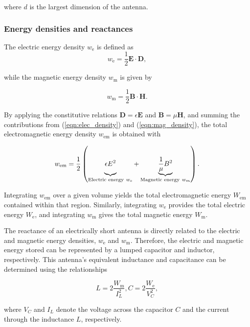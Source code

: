 where $d$ is the largest dimension of the antenna.

\FloatBarrier
\subsubsection{Energy densities and reactances}\label{sec:energy-densities-reactances}

The electric energy density $w_{\mathrm{e}}$ is defined as 
\begin{equation}
	w_{\mathrm{e}} = \frac{1}{2} \mathbf{E} \cdot \mathbf{D},
	\label{eqn:elec_density}
\end{equation}

while the magnetic energy density $w_{\mathrm{m}}$ is given by 

\begin{equation}
	w_{\mathrm{m}} = \frac{1}{2} \mathbf{B} \cdot \mathbf{H}.
	\label{eqn:mag_density}
\end{equation}

By applying the constitutive relations $\mathbf{D} = \epsilon \mathbf{E}$ and $\mathbf{B} = \mu \mathbf{H}$, and summing the contributions from (\ref{eqn:elec_density}) and (\ref{eqn:mag_density}), the total electromagnetic energy density $w_{\mathrm{em}}$ is obtained with \cite[p. 330]{Griffiths_2024} 

\begin{equation}
	w_\mathrm{em} = \frac{1}{2}\left(\underbrace{\vphantom{\frac{1}{\mu} B ^ 2}{\epsilon E^2}}_{{\text{Electric energy}\ w_e}} + \underbrace{\frac{1}{\mu} B ^ 2}_{{\text{Magnetic energy} \ w_m}}\right).
	\label{eqn:em_energy}
\end{equation}  

Integrating $w_\mathrm{em}$ over a given volume yields the total electromagnetic energy $W_\mathrm{em}$ contained within that region. Similarly, integrating $w_{\mathrm{e}}$ provides the total electric energy $W_{\mathrm{e}}$, and integrating $w_{\mathrm{m}}$ gives the total magnetic energy $W_{\mathrm{m}}$.

The reactance of an electrically short antenna is directly related to the electric and magnetic energy densities, $w_{\mathrm{e}}$ and $w_{\mathrm{m}}$. Therefore, the electric and magnetic energy stored can be represented by a lumped capacitor and inductor, respectively. This antenna’s equivalent inductance and capacitance can be determined using the relationships \cite[pp. 107, 328]{Griffiths_2024}

\begin{subequations}
	\begin{equation}
		L = 2\frac{W_{\mathrm{m}}}{I_L^2},
		\label{eqn:l_m_energy}
	\end{equation}
	\begin{equation}
		C = 2 \frac{W_{\mathrm{e}}}{V_C^2},
		\label{eqn:c_e_energy}
	\end{equation}
\end{subequations}

where $V_C$ and $I_L$ denote the voltage across the capacitor $C$ and the current through the inductance $L$, respectively.

